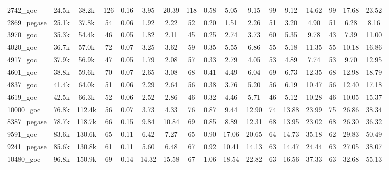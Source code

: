 \documentclass{standalone}
\begin{document}
\begin{tabular}{|l|c|c|cccc|cccc|ccc|ccc|}
2742\_goc 
&  24.5k
&  38.2k
& 126 
&  0.16
&  3.95
& 20.39
& 118 
&  0.58
&  5.05
&  9.15
& 99 
&  9.12
& 14.62
& 99 
& 17.68
& 23.52
\\

2869\_pegase 
&  25.1k
&  37.8k
& 54 
&  0.06
&  1.92
&  2.22
& 52 
&  0.20
&  1.51
&  2.26
& 51 
&  3.20
&  4.90
& 51 
&  6.28
&  8.16
\\
\hline
3970\_goc 
&  35.3k
&  54.4k
& 46 
&  0.05
&  1.82
&  2.11
& 45 
&  0.25
&  2.74
&  3.73
& 60 
&  5.35
&  9.78
& 43 
&  7.39
& 11.00
\\

4020\_goc 
&  36.7k
&  57.0k
& 72 
&  0.07
&  3.25
&  3.62
& 59 
&  0.35
&  5.55
&  6.86
& 55 
&  5.18
& 11.35
& 55 
& 10.18
& 16.86
\\

4917\_goc 
&  37.9k
&  56.9k
& 47 
&  0.05
&  1.79
&  2.08
& 57 
&  0.33
&  2.79
&  4.05
& 53 
&  4.89
&  7.74
& 53 
&  9.70
& 12.95
\\

4601\_goc 
&  38.8k
&  59.6k
& 70 
&  0.07
&  2.65
&  3.08
& 68 
&  0.41
&  4.49
&  6.04
& 69 
&  6.73
& 12.35
& 68 
& 12.98
& 18.79
\\

4837\_goc 
&  41.4k
&  64.0k
& 51 
&  0.06
&  2.29
&  2.64
& 56 
&  0.38
&  3.76
&  5.20
& 56 
&  6.19
& 10.47
& 56 
& 12.40
& 17.18
\\
\hline
4619\_goc 
&  42.5k
&  66.3k
& 52 
&  0.06
&  2.52
&  2.86
& 46 
&  0.32
&  4.46
&  5.71
& 46 
&  5.12
& 10.28
& 46 
& 10.05
& 15.37
\\

10000\_goc 
&  76.8k
& 112.4k
& 56 
&  0.07
&  3.73
&  4.33
& 76 
&  0.87
&  9.44
& 12.90
& 74 
& 13.88
& 23.99
& 75 
& 26.86
& 38.34
\\

8387\_pegase 
&  78.7k
& 118.7k
& 66 
&  0.15
&  9.84
& 10.84
& 69 
&  0.85
&  8.89
& 12.31
& 68 
& 13.95
& 23.02
& 68 
& 26.30
& 36.32
\\

9591\_goc 
&  83.6k
& 130.6k
& 65 
&  0.11
&  6.42
&  7.27
& 65 
&  0.90
& 17.06
& 20.65
& 64 
& 14.73
& 35.18
& 62 
& 29.83
& 50.49
\\

9241\_pegase 
&  85.6k
& 130.8k
& 61 
&  0.11
&  5.60
&  6.48
& 67 
&  0.92
& 10.41
& 14.13
& 63 
& 14.47
& 24.44
& 63 
& 27.05
& 38.07
\\
\hline
10480\_goc 
&  96.8k
& 150.9k
& 69 
&  0.14
& 14.32
& 15.58
& 67 
&  1.06
& 18.54
& 22.82
& 63 
& 16.56
& 37.33
& 63 
& 32.68
& 55.13
\\


\end{tabular}
\end{document}
